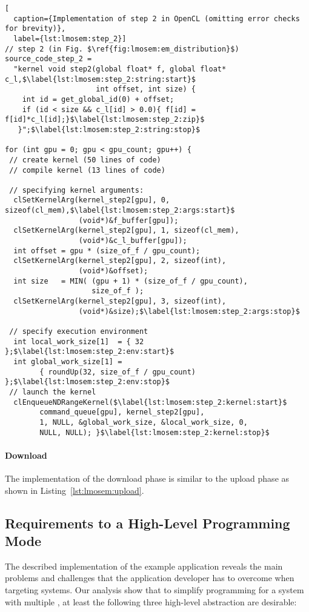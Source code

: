 \begin{lstlisting}[
  caption={Implementation of step 2 in OpenCL (omitting error checks for brevity)},
  label={lst:lmosem:step_2}]
// step 2 (in Fig. $\ref{fig:lmosem:em_distribution}$)
source_code_step_2 =
  "kernel void step2(global float* f, global float* c_l,$\label{lst:lmosem:step_2:string:start}$
                     int offset, int size) {
    int id = get_global_id(0) + offset;
    if (id < size && c_l[id] > 0.0){ f[id] = f[id]*c_l[id];}$\label{lst:lmosem:step_2:zip}$
   }";$\label{lst:lmosem:step_2:string:stop}$

for (int gpu = 0; gpu < gpu_count; gpu++) {
 // create kernel (50 lines of code)
 // compile kernel (13 lines of code)

 // specifying kernel arguments:
  clSetKernelArg(kernel_step2[gpu], 0, sizeof(cl_mem),$\label{lst:lmosem:step_2:args:start}$
                 (void*)&f_buffer[gpu]);
  clSetKernelArg(kernel_step2[gpu], 1, sizeof(cl_mem),
                 (void*)&c_l_buffer[gpu]);
  int offset = gpu * (size_of_f / gpu_count);
  clSetKernelArg(kernel_step2[gpu], 2, sizeof(int),
                 (void*)&offset);
  int size   = MIN( (gpu + 1) * (size_of_f / gpu_count),
                    size_of_f );
  clSetKernelArg(kernel_step2[gpu], 3, sizeof(int),
                 (void*)&size);$\label{lst:lmosem:step_2:args:stop}$

 // specify execution environment
  int local_work_size[1]  = { 32 };$\label{lst:lmosem:step_2:env:start}$
  int global_work_size[1] =
        { roundUp(32, size_of_f / gpu_count) };$\label{lst:lmosem:step_2:env:stop}$
 // launch the kernel
  clEnqueueNDRangeKernel($\label{lst:lmosem:step_2:kernel:start}$
        command_queue[gpu], kernel_step2[gpu],
        1, NULL, &global_work_size, &local_work_size, 0,
        NULL, NULL); }$\label{lst:lmosem:step_2:kernel:stop}$
\end{lstlisting}


\paragraph{Download}
The implementation of the download phase is similar to the upload phase as shown in Listing~\ref{lst:lmosem:upload}.


\subsection{Requirements to a High-Level Programming Mode}
\label{section:requirements}
The described implementation of the example application reveals the main problems and challenges that the application developer has to overcome when targeting \GPU systems.
Our analysis show that to simplify programming for a system with multiple \GPUs, at least the following three high-level abstraction are desirable:

